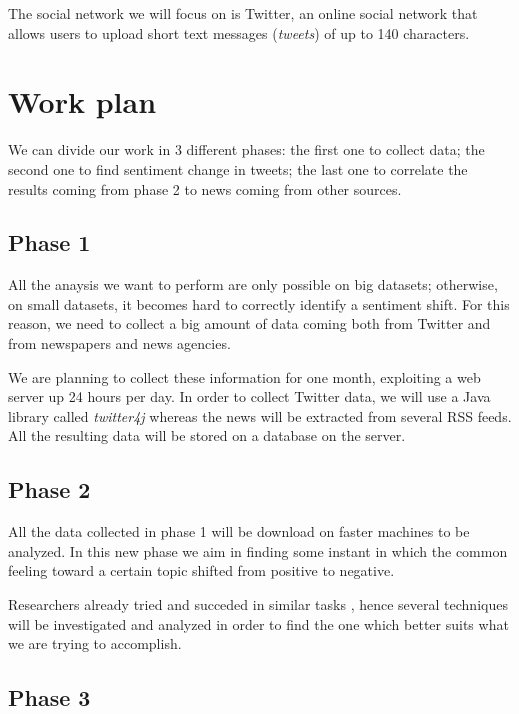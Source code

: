 \documentclass[a4paper]{article}
\begin{document}
The social network we will focus on is Twitter, an online social network that
allows users to upload short text messages (\emph{tweets}) of up to 140 characters.

\section{Work plan}
We can divide our work in 3 different phases: the first one to collect data; the
second one to find sentiment change in tweets; the last one to correlate the
results coming from phase 2 to news coming from other sources.

\subsection{Phase 1}
All the anaysis we want to perform are only possible on big datasets; otherwise,
on small datasets, it becomes hard to correctly identify a sentiment shift. For
this reason, we need to collect a big amount of data coming both from Twitter
and from newspapers and news agencies.

We are planning to collect these information for one month, exploiting a web
server up 24 hours per day. In order to collect Twitter data, we will use a Java
library called \emph{twitter4j} whereas the news will be extracted from several
RSS feeds. All the resulting data will be stored on a database on the server.

\subsection{Phase 2}
All the data collected in phase 1 will be download on faster machines to be
analyzed. In this new phase we aim in finding some instant in which the common
feeling toward a certain topic shifted from positive to negative.

Researchers already tried and succeded in similar tasks
\cite{Bifet}\cite{Go}\cite{Palpanas}, hence several
techniques will be investigated and analyzed in order to find the one which
better suits what we are trying to accomplish.

\subsection{Phase 3}
\end{document}
